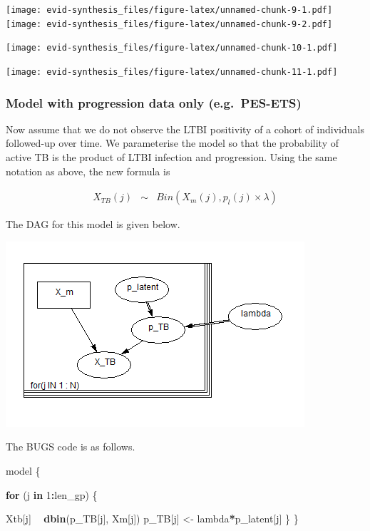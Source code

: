 \documentclass[]{article}
\newenvironment{Shaded}{\begin{snugshade}}{\end{snugshade}}
\newcommand{\ControlFlowTok}[1]{\textcolor[rgb]{0.13,0.29,0.53}{\textbf{#1}}}
\newcommand{\DecValTok}[1]{\textcolor[rgb]{0.00,0.00,0.81}{#1}}
\newcommand{\KeywordTok}[1]{\textcolor[rgb]{0.13,0.29,0.53}{\textbf{#1}}}
\newcommand{\NormalTok}[1]{#1}
\newcommand{\OperatorTok}[1]{\textcolor[rgb]{0.81,0.36,0.00}{\textbf{#1}}}
\newcommand{\StringTok}[1]{\textcolor[rgb]{0.31,0.60,0.02}{#1}}
\begin{document}
\texttt{[image: evid-synthesis\_files/figure-latex/unnamed-chunk-9-1.pdf]}
\texttt{[image: evid-synthesis\_files/figure-latex/unnamed-chunk-9-2.pdf]}

\texttt{[image: evid-synthesis\_files/figure-latex/unnamed-chunk-10-1.pdf]}

\texttt{[image: evid-synthesis\_files/figure-latex/unnamed-chunk-11-1.pdf]}

\hypertarget{model-with-progression-data-only-e.g.-pes-ets}{%
\subsubsection{Model with progression data only
(e.g.~PES-ETS)}\label{model-with-progression-data-only-e.g.-pes-ets}}

Now assume that we do not observe the LTBI positivity of a cohort of
individuals followed-up over time. We parameterise the model so that the
probability of active TB is the product of LTBI infection and
progression. Using the same notation as above, the new formula is

\begin{eqnarray*}
X_{TB}(j) &\sim& Bin(X_m(j), p_l(j) \times \lambda)
\end{eqnarray*}

The DAG for this model is given below.

\includegraphics{DAG-ETS.PNG}

The BUGS code is as follows.

\begin{Shaded}
\begin{Highlighting}[]
\NormalTok{model \{}

  \ControlFlowTok{for}\NormalTok{ (j }\ControlFlowTok{in} \DecValTok{1}\OperatorTok{:}\NormalTok{len_gp) \{}

\NormalTok{      Xtb[j] }\OperatorTok{~}\StringTok{ }\KeywordTok{dbin}\NormalTok{(p_TB[j], Xm[j])}
\NormalTok{      p_TB[j] <-}\StringTok{ }\NormalTok{lambda}\OperatorTok{*}\NormalTok{p_latent[j]}
\NormalTok{    \}}
\NormalTok{\}}
\end{Highlighting}
\end{Shaded}
\end{document}
